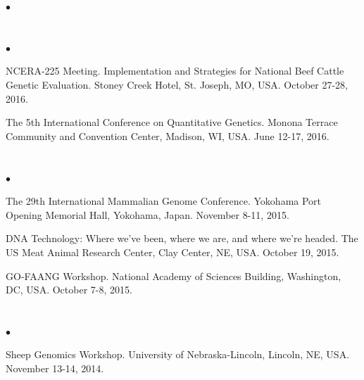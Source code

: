 \documentclass[margin,line,10pt]{res}
\newenvironment{list2}{
  \begin{list}{$\bullet$}{%
      \setlength{\itemsep}{0in}
      \setlength{\parsep}{0in} \setlength{\parskip}{0in}
      \setlength{\topsep}{0in} \setlength{\partopsep}{0in} 
      \setlength{\leftmargin}{0.2in}}}{\end{list}}
\begin{document}
\begin{resume}
\begin{list2}
  
  \end{list2}  


\section{}
\begin{list2}

\item NCERA-225 Meeting. Implementation and Strategies for National Beef Cattle Genetic Evaluation. Stoney Creek Hotel, St. Joseph, MO, USA. October 27-28, 2016. 

  \vspace{0.5cm}
  
\item The 5th International Conference on Quantitative Genetics. Monona Terrace Community and Convention Center, Madison, WI, USA. June 12-17, 2016.

\end{list2}  




\section{}
\begin{list2}
  
\item The 29th International Mammalian Genome Conference. Yokohama Port Opening Memorial Hall, Yokohama, Japan. November 8-11, 2015.

  \vspace{0.5cm}
  
  \item DNA Technology: Where we've been, where we are, and where we're headed. The US Meat Animal Research Center, Clay Center, NE, USA. October 19, 2015. 
  
  \vspace{0.5cm}
  
\item GO-FAANG Workshop. National Academy of Sciences Building, Washington, DC, USA. October 7-8, 2015.
\end{list2}  

\section{}
\begin{list2}

\item Sheep Genomics Workshop. University of Nebraska-Lincoln, Lincoln, NE, USA. November 13-14, 2014.  


\end{list2}
\end{resume}
\end{document}
